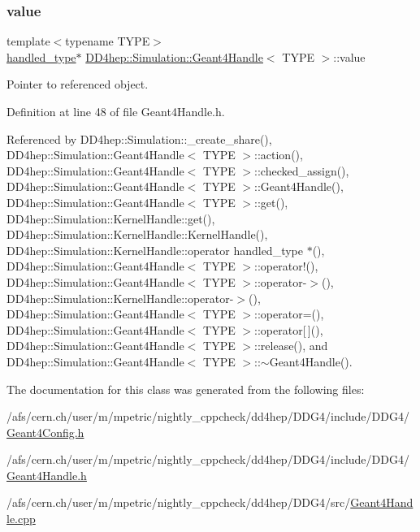 \subsubsection{\texorpdfstring{value}{value}}
{\footnotesize\ttfamily template$<$typename T\+Y\+PE$>$ \\
\hyperlink{class_d_d4hep_1_1_simulation_1_1_geant4_handle_a35e583b9228e38c95d23112ad19b645d}{handled\+\_\+type}$\ast$ \hyperlink{class_d_d4hep_1_1_simulation_1_1_geant4_handle}{D\+D4hep\+::\+Simulation\+::\+Geant4\+Handle}$<$ T\+Y\+PE $>$\+::value\hspace{0.3cm}{\ttfamily [mutable]}}



Pointer to referenced object. 



Definition at line 48 of file Geant4\+Handle.\+h.



Referenced by D\+D4hep\+::\+Simulation\+::\+\_\+create\+\_\+share(), D\+D4hep\+::\+Simulation\+::\+Geant4\+Handle$<$ T\+Y\+P\+E $>$\+::action(), D\+D4hep\+::\+Simulation\+::\+Geant4\+Handle$<$ T\+Y\+P\+E $>$\+::checked\+\_\+assign(), D\+D4hep\+::\+Simulation\+::\+Geant4\+Handle$<$ T\+Y\+P\+E $>$\+::\+Geant4\+Handle(), D\+D4hep\+::\+Simulation\+::\+Geant4\+Handle$<$ T\+Y\+P\+E $>$\+::get(), D\+D4hep\+::\+Simulation\+::\+Kernel\+Handle\+::get(), D\+D4hep\+::\+Simulation\+::\+Kernel\+Handle\+::\+Kernel\+Handle(), D\+D4hep\+::\+Simulation\+::\+Kernel\+Handle\+::operator handled\+\_\+type $\ast$(), D\+D4hep\+::\+Simulation\+::\+Geant4\+Handle$<$ T\+Y\+P\+E $>$\+::operator!(), D\+D4hep\+::\+Simulation\+::\+Geant4\+Handle$<$ T\+Y\+P\+E $>$\+::operator-\/$>$(), D\+D4hep\+::\+Simulation\+::\+Kernel\+Handle\+::operator-\/$>$(), D\+D4hep\+::\+Simulation\+::\+Geant4\+Handle$<$ T\+Y\+P\+E $>$\+::operator=(), D\+D4hep\+::\+Simulation\+::\+Geant4\+Handle$<$ T\+Y\+P\+E $>$\+::operator\mbox{[}$\,$\mbox{]}(), D\+D4hep\+::\+Simulation\+::\+Geant4\+Handle$<$ T\+Y\+P\+E $>$\+::release(), and D\+D4hep\+::\+Simulation\+::\+Geant4\+Handle$<$ T\+Y\+P\+E $>$\+::$\sim$\+Geant4\+Handle().



The documentation for this class was generated from the following files\+:\begin{DoxyCompactItemize}
\item 
/afs/cern.\+ch/user/m/mpetric/nightly\+\_\+cppcheck/dd4hep/\+D\+D\+G4/include/\+D\+D\+G4/\hyperlink{_geant4_config_8h}{Geant4\+Config.\+h}\item 
/afs/cern.\+ch/user/m/mpetric/nightly\+\_\+cppcheck/dd4hep/\+D\+D\+G4/include/\+D\+D\+G4/\hyperlink{_geant4_handle_8h}{Geant4\+Handle.\+h}\item 
/afs/cern.\+ch/user/m/mpetric/nightly\+\_\+cppcheck/dd4hep/\+D\+D\+G4/src/\hyperlink{_geant4_handle_8cpp}{Geant4\+Handle.\+cpp}\end{DoxyCompactItemize}

